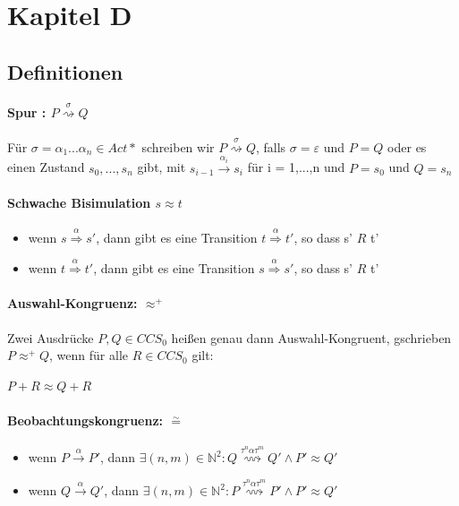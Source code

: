 \documentclass[a4paper,10pt, oneside]{book}
\begin{document}
\chapter*{Kapitel D}
\section{Definitionen}
\subsubsection{Spur : $P \overset{\sigma}{\rightsquigarrow} Q$}
Für $\sigma = \alpha_1 ... \alpha_n \in Act*$ schreiben wir $P \overset{\sigma}{\rightsquigarrow} Q$, falls $\sigma = \varepsilon$ und $P = Q$ oder es einen Zustand $s_0, ... , s_n$ gibt, mit $s_{i-1} \xrightarrow{\alpha_i} s_i$ für i = 1,...,n und $P = s_0$ und $Q = s_n$

\subsubsection*{Schwache Bisimulation $s \approx t$}
\begin{itemize}
 \item wenn $s \overset{\alpha}{\Rightarrow} s'$, dann gibt es eine Transition $t \overset{\alpha}{\Rightarrow} t'$, so dass s' $R$ t'
 \item wenn $t \overset{\alpha}{\Rightarrow} t'$, dann gibt es eine Transition $s \overset{\alpha}{\Rightarrow} s'$, so dass s' $R$ t'
\end{itemize}

\subsubsection*{Auswahl-Kongruenz: $\approx^+$}
Zwei Ausdrücke $P,Q \in CCS_0$ heißen genau dann Auswahl-Kongruent, gschrieben $P \approx^+ Q$, wenn für alle $R \in CCS_0$ gilt:
\begin{center}
 $P + R \approx Q + R$
\end{center}

\subsubsection*{Beobachtungskongruenz: $\overset{\sim}{=}$}
\begin{itemize}
 \item wenn $P \xrightarrow{\alpha} P'$, dann $\exists (n,m) \in \mathds{N}^2: Q \overset{\tau^n \alpha \tau^m}{\rightsquigarrow} Q' \wedge P' \approx Q'$
 \item wenn $Q \xrightarrow{\alpha} Q'$, dann $\exists (n,m) \in \mathds{N}^2: P \overset{\tau^n \alpha \tau^m}{\rightsquigarrow} P' \wedge P' \approx Q'$
\end{itemize}
\end{document}
